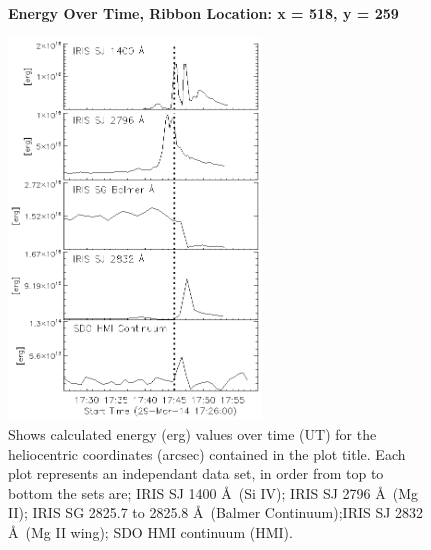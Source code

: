\begin{figure}[H]
  \begin{center}
  \textbf{Energy Over Time, Ribbon Location: x = 518, y = 259 }\par\medskip
  \includegraphics[width=0.6\textwidth]{29-Mar-14-Ribbon-xyPosition-518-259-Frame-2-Energy-Ladder}
  \end{center}
  \caption{Shows calculated energy (erg) values over time (UT) for the heliocentric coordinates (arcsec) contained in the plot title. Each plot represents an independant data set, in order from top to bottom the sets are; IRIS SJ 1400 \AA\ (Si IV); IRIS SJ 2796 \AA\ (Mg II); IRIS SG  2825.7 to 2825.8 \AA\ (Balmer Continuum);IRIS SJ 2832 \AA\ (Mg II wing); SDO HMI continuum (HMI).}\label{erb11}
\end{figure}

